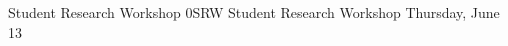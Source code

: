\begin{wsschedule}
{Student Research Workshop}
{0}{SRW}
{Student Research Workshop}
{Thursday, June 13}{\SRWLoc}

\end{wsschedule}
